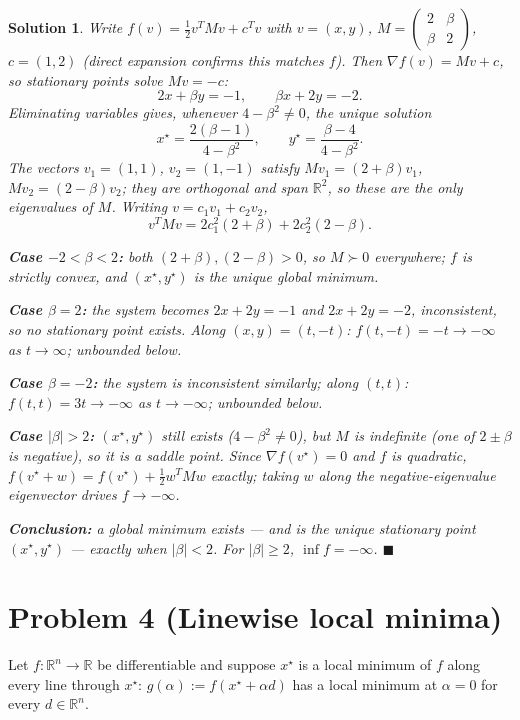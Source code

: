 \documentclass[11pt]{article}
\newcommand{\R}{\mathbb{R}}
\newtheorem*{solution}{Solution}
\begin{document}
\begin{solution}
Write $f(v)=\tfrac12v^TMv+c^Tv$ with $v=(x,y)$, $M=\begin{pmatrix}2&\beta\\\beta&2\end{pmatrix}$, $c=(1,2)$ (direct expansion confirms this matches $f$). Then $\nabla f(v)=Mv+c$, so stationary points solve $Mv=-c$:
\[
2x+\beta y=-1, \qquad \beta x+2y=-2.
\]
Eliminating variables gives, whenever $4-\beta^2\ne0$, the unique solution
\[
x^\star=\frac{2(\beta-1)}{4-\beta^2}, \qquad y^\star=\frac{\beta-4}{4-\beta^2}.
\]
The vectors $v_1=(1,1)$, $v_2=(1,-1)$ satisfy $Mv_1=(2+\beta)v_1$, $Mv_2=(2-\beta)v_2$; they are orthogonal and span $\R^2$, so these are the only eigenvalues of $M$. Writing $v=c_1v_1+c_2v_2$,
\[
v^TMv = 2c_1^2(2+\beta)+2c_2^2(2-\beta).
\]

\textbf{Case $-2<\beta<2$:} both $(2+\beta),(2-\beta)>0$, so $M\succ0$ everywhere; $f$ is strictly convex, and $(x^\star,y^\star)$ is the unique global minimum.

\textbf{Case $\beta=2$:} the system becomes $2x+2y=-1$ and $2x+2y=-2$, inconsistent, so no stationary point exists. Along $(x,y)=(t,-t)$: $f(t,-t)=-t\to-\infty$ as $t\to\infty$; unbounded below.

\textbf{Case $\beta=-2$:} the system is inconsistent similarly; along $(t,t)$: $f(t,t)=3t\to-\infty$ as $t\to-\infty$; unbounded below.

\textbf{Case $|\beta|>2$:} $(x^\star,y^\star)$ still exists ($4-\beta^2\ne0$), but $M$ is indefinite (one of $2\pm\beta$ is negative), so it is a saddle point. Since $\nabla f(v^\star)=0$ and $f$ is quadratic, $f(v^\star+w)=f(v^\star)+\tfrac12w^TMw$ exactly; taking $w$ along the negative-eigenvalue eigenvector drives $f\to-\infty$.

\textbf{Conclusion:} a global minimum exists --- and is the unique stationary point $(x^\star,y^\star)$ --- exactly when $|\beta|<2$. For $|\beta|\ge2$, $\inf f=-\infty$. $\blacksquare$
\end{solution}

\section*{Problem 4 (Linewise local minima)}

Let $f:\R^n\to\R$ be differentiable and suppose $x^\star$ is a local minimum of $f$ along every line through $x^\star$: $g(\alpha):=f(x^\star+\alpha d)$ has a local minimum at $\alpha=0$ for every $d\in\R^n$.
\end{document}
